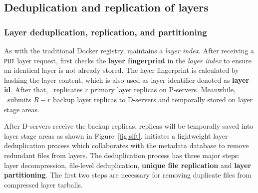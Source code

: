 \subsection{Deduplication and replication of layers}
\label{sec:dedup-desgin}

%
%

\subsubsection{Layer deduplication, replication, and partitioning}

As with the traditional Docker registry, 
\sysname maintains a \emph{layer index}.
After receiving a \texttt{PUT} layer request,
\sysname first checks the \textbf{layer fingerprint} in the \emph{layer index} to ensure 
an identical layer is not already stored.
The layer fingerprint is calculated by hashing the layer content, which is also used as layer identifier denoted as \textbf{layer id}.
After that, \sysname~replicates $r$ primary layer replicas on P-servers. 
Meanwhile, \sysname~submits $R-r$ backup layer replicas to D-servers and temporally stored on layer stage areas.

 
 After D-servers receive the backup replicas,
 replicas will be temporally saved into layer stage areas as shown in Figure~\ref{fig:sift}.
 \sysname initiates a lightweight layer deduplication process which collaborates with the metadata database
 to remove redundant files from layers. 
The deduplication process has three major steps: 
layer decompression, 
file-level deduplication,
\textbf{unique file replication} and \textbf{layer partitioning}. 
The first two steps are necessary for removing duplicate files from compressed layer tarballs.

